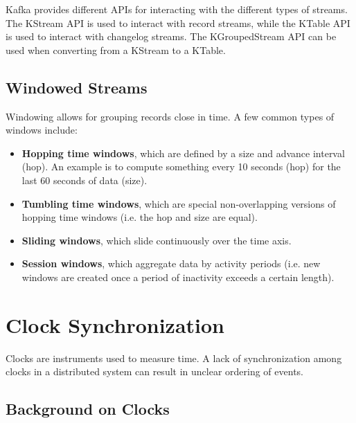 \documentclass[12pt,titlepage]{article}
\begin{document}
      Kafka provides different APIs for interacting with the different types of streams. The KStream API is used to interact with record streams, while
      the KTable API is used to interact with changelog streams. The KGroupedStream API can be used when converting from a KStream to a KTable.

    \subsection{Windowed Streams}
      Windowing allows for grouping records close in time. A few common types of windows include:
      \begin{itemize}
        \item \textbf{Hopping time windows}, which are defined by a size and advance interval (hop). An example is to compute something every 10 seconds (hop)
          for the last 60 seconds of data (size).
        \item \textbf{Tumbling time windows}, which are special non-overlapping versions of hopping time windows (i.e. the hop and size are equal).
        \item \textbf{Sliding windows}, which slide continuously over the time axis.
        \item \textbf{Session windows}, which aggregate data by activity periods (i.e. new windows are created once a period of inactivity exceeds a certain length).
      \end{itemize}

  \newpage

  \section{Clock Synchronization}
    Clocks are instruments used to measure time. A lack of synchronization among clocks in a distributed system can result in unclear ordering of events.

    \subsection{Background on Clocks}
\end{document}
